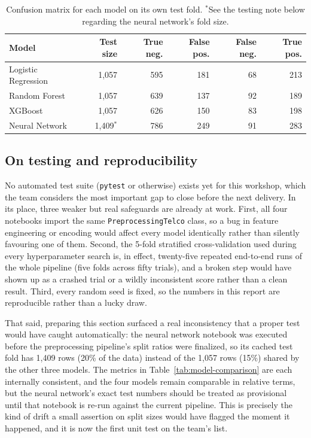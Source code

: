 \documentclass{article}
\begin{document}
\begin{table}[H]
\centering
\small
\begin{tabular}{lrrrrr}
\toprule
\textbf{Model} & \textbf{Test size} & \textbf{True neg.} & \textbf{False pos.} & \textbf{False neg.} & \textbf{True pos.} \\
\midrule
Logistic Regression & 1,057 & 595 & 181 & 68 & 213 \\
Random Forest        & 1,057 & 639 & 137 & 92 & 189 \\
XGBoost              & 1,057 & 626 & 150 & 83 & 198 \\
Neural Network       & 1,409$^{*}$ & 786 & 249 & 91 & 283 \\
\bottomrule
\end{tabular}
\caption{\centering Confusion matrix for each model on its own test fold. $^{*}$See the testing note below regarding the neural network's fold size.}
\label{tab:confusion-summary}
\end{table}

\subsection{On testing and reproducibility}
No automated test suite (\texttt{pytest} or otherwise) exists yet for this workshop, which the team considers the most important gap to close before the next delivery. In its place, three weaker but real safeguards are already at work. First, all four notebooks import the same \texttt{PreprocessingTelco} class, so a bug in feature engineering or encoding would affect every model identically rather than silently favouring one of them. Second, the 5-fold stratified cross-validation used during every hyperparameter search is, in effect, twenty-five repeated end-to-end runs of the whole pipeline (five folds across fifty trials), and a broken step would have shown up as a crashed trial or a wildly inconsistent score rather than a clean result. Third, every random seed is fixed, so the numbers in this report are reproducible rather than a lucky draw.

That said, preparing this section surfaced a real inconsistency that a proper test would have caught automatically: the neural network notebook was executed before the preprocessing pipeline's split ratios were finalized, so its cached test fold has 1,409 rows (20\% of the data) instead of the 1,057 rows (15\%) shared by the other three models. The metrics in Table~\ref{tab:model-comparison} are each internally consistent, and the four models remain comparable in relative terms, but the neural network's exact test numbers should be treated as provisional until that notebook is re-run against the current pipeline. This is precisely the kind of drift a small assertion on split sizes would have flagged the moment it happened, and it is now the first unit test on the team's list.
\end{document}
